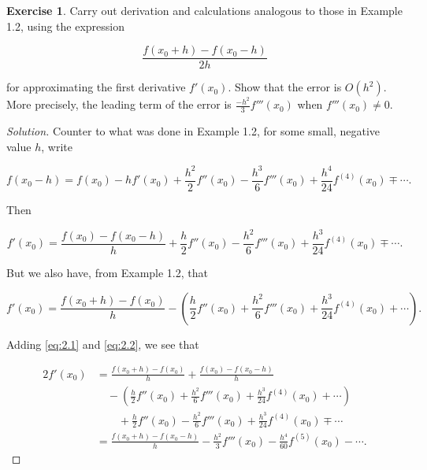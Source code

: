 \documentclass[12pt,a4]{article}
\theoremstyle{definition}
\newtheorem{exercise}{Exercise}
\begin{document}
\begin{exercise}
	 Carry out derivation and calculations analogous to those in Example 1.2, using the expression
	 
	 \[
	 \frac{f(x_0 + h) - f(x_0 - h)}{2 h}
	 \]
	 
	 \noindent for approximating the first derivative $f'(x_0)$. Show that the error is $O(h^2)$. More precisely, the leading term of the error is $\frac{-h^2}{3} f'''(x_0)$ when $f'''(x_0) \neq 0$.
\end{exercise}
\begin{proof}[Solution]
	Counter to what was done in Example 1.2, for some small, negative value $h$, write 
	
	\[
	f(x_0 - h) = f(x_0) - h f'(x_0) + \frac{h^2}{2} f''(x_0) - \frac{h^3}{6} f'''(x_0) + \frac{h^4}{24} f^{(4)} (x_0) \mp \cdots {.}
	\]
	
	\noindent Then 
	
	\[
	f'(x_0) = \frac{f(x_0) - f(x_0 - h)}{h} + \frac{h}{2} f''(x_0) - \frac{h^2}{6} f'''(x_0) + \frac{h^3}{24} f^{(4)} (x_0) \mp \cdots {.} \tag{2.1} \label{eq:2.1}
	\]
	
	\noindent But we also have, from Example 1.2, that
	
	\[
	f'(x_0) = \frac{f(x_0 + h) - f(x_0)}{h} - \left( \frac{h}{2} f''(x_0) + \frac{h^2}{6} f'''(x_0) + \frac{h^3}{24} f^{(4)} (x_0) + \cdots \right) {.} \tag{2.2} \label{eq:2.2} 
	\]
	
	\noindent Adding \hyperref[eq:2.1]{\eqref{eq:2.1}} and \hyperref[eq:2.2]{\eqref{eq:2.2}}, we see that 
	
	\begin{align*}
	2 f'(x_0) &= \frac{f(x_0 + h) - f(x_0)}{h} + \frac{f(x_0) - f(x_0 - h)}{h} \\
	 &\quad - \left( \frac{h}{2} f''(x_0) + \frac{h^2}{6} f'''(x_0) + \frac{h^3}{24} f^{(4)} (x_0) + \cdots \right) \\
	 &\qquad + \frac{h}{2} f''(x_0) - \frac{h^2}{6} f'''(x_0) + \frac{h^3}{24} f^{(4)} (x_0) \mp \cdots \\
	 &= \frac{f(x_0 + h) - f(x_0 - h)}{h} - \frac{h^2}{3} f'''(x_0) - \frac{h^4}{60} f^{(5)} (x_0) - \cdots {.} \tag{2.3} \label{2.3}
	\end{align*}
	
	\noindent 
\end{proof}
\end{document}
